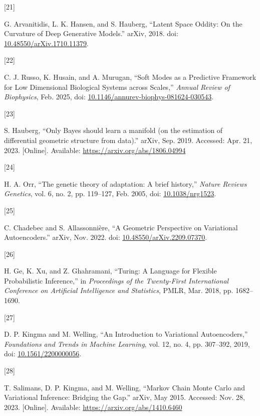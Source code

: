 \documentclass[
]{scrartcl}
\newlength{\cslhangindent}
\newlength{\csllabelwidth}
\newenvironment{CSLReferences}[2] %
 {\begin{list}{}{%
  \setlength{\itemindent}{0pt}
  \setlength{\leftmargin}{0pt}
  \setlength{\parsep}{0pt}
  \ifodd #1
   \setlength{\leftmargin}{\cslhangindent}
   \setlength{\itemindent}{-1\cslhangindent}
  \fi
  \setlength{\itemsep}{#2\baselineskip}}}
 {\end{list}}
\newcommand{\CSLLeftMargin}[1]{\parbox[t]{\csllabelwidth}{\strut#1\strut}}
\newcommand{\CSLRightInline}[1]{\parbox[t]{\linewidth - \csllabelwidth}{\strut#1\strut}}
\begin{document}
\begin{CSLReferences}{0}{0}
\CSLLeftMargin{{[}21{]} }%
\CSLRightInline{G. Arvanitidis, L. K. Hansen, and S. Hauberg, {``Latent
{Space Oddity}: On the {Curvature} of {Deep Generative Models}.''}
arXiv, 2018. doi:
\href{https://doi.org/10.48550/arXiv.1710.11379}{10.48550/arXiv.1710.11379}.}

\CSLLeftMargin{{[}22{]} }%
\CSLRightInline{C. J. Russo, K. Husain, and A. Murugan, {``Soft {Modes}
as a {Predictive Framework} for {Low Dimensional Biological Systems}
across {Scales},''} \emph{Annual Review of Biophysics}, Feb. 2025, doi:
\href{https://doi.org/10.1146/annurev-biophys-081624-030543}{10.1146/annurev-biophys-081624-030543}.}

\CSLLeftMargin{{[}23{]} }%
\CSLRightInline{S. Hauberg, {``Only {Bayes} should learn a manifold (on
the estimation of differential geometric structure from data).''} arXiv,
Sep. 2019. Accessed: Apr. 21, 2023. {[}Online{]}. Available:
\url{https://arxiv.org/abs/1806.04994}}

\CSLLeftMargin{{[}24{]} }%
\CSLRightInline{H. A. Orr, {``The genetic theory of adaptation: A brief
history,''} \emph{Nature Reviews Genetics}, vol. 6, no. 2, pp. 119--127,
Feb. 2005, doi:
\href{https://doi.org/10.1038/nrg1523}{10.1038/nrg1523}.}

\CSLLeftMargin{{[}25{]} }%
\CSLRightInline{C. Chadebec and S. Allassonnière, {``A {Geometric
Perspective} on {Variational Autoencoders}.''} arXiv, Nov. 2022. doi:
\href{https://doi.org/10.48550/arXiv.2209.07370}{10.48550/arXiv.2209.07370}.}

\CSLLeftMargin{{[}26{]} }%
\CSLRightInline{H. Ge, K. Xu, and Z. Ghahramani, {``Turing: {A Language}
for {Flexible Probabilistic Inference},''} in \emph{Proceedings of the
{Twenty-First International Conference} on {Artificial Intelligence} and
{Statistics}}, PMLR, Mar. 2018, pp. 1682--1690.}

\CSLLeftMargin{{[}27{]} }%
\CSLRightInline{D. P. Kingma and M. Welling, {``An {Introduction} to
{Variational Autoencoders},''} \emph{Foundations and
Trends{\textregistered} in Machine Learning}, vol. 12, no. 4, pp.
307--392, 2019, doi:
\href{https://doi.org/10.1561/2200000056}{10.1561/2200000056}.}

\CSLLeftMargin{{[}28{]} }%
\CSLRightInline{T. Salimans, D. P. Kingma, and M. Welling, {``Markov
{Chain Monte Carlo} and {Variational Inference}: {Bridging} the
{Gap}.''} arXiv, May 2015. Accessed: Nov. 28, 2023. {[}Online{]}.
Available: \url{https://arxiv.org/abs/1410.6460}}


\end{CSLReferences}
\end{document}
